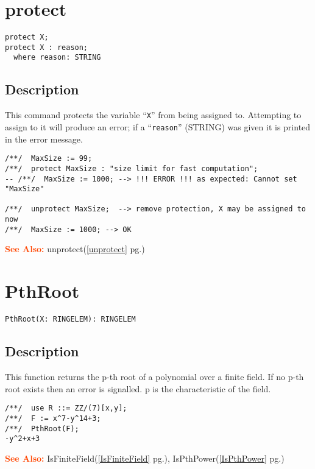\documentclass[a4paper]{mybook}
\newenvironment{command}{}{} %
\newcommand\SeeAlso{\par\textcolor{OrangeRed}{\textbf{\large See Also: }}}
\begin{document}
\section{protect}
\label{protect}
\begin{command} %


\begin{Verbatim}[label=syntax, rulecolor=\color{MidnightBlue},
frame=single]
protect X;
protect X : reason;
  where reason: STRING
\end{Verbatim}


\subsection*{Description}

This command protects the variable ``\verb&X&'' from being assigned to.
Attempting to assign to it will produce an error; if a ``\verb&reason&''
(STRING) was given it is printed in the error message.
\begin{Verbatim}[label=example, rulecolor=\color{PineGreen}, frame=single]
/**/  MaxSize := 99;
/**/  protect MaxSize : "size limit for fast computation";
-- /**/  MaxSize := 1000; --> !!! ERROR !!! as expected: Cannot set "MaxSize"

/**/  unprotect MaxSize;  --> remove protection, X may be assigned to now
/**/  MaxSize := 1000; --> OK
\end{Verbatim}


\SeeAlso %
  unprotect(\ref{unprotect} pg.\pageref{unprotect})
\end{command} %

\section{PthRoot}
\label{PthRoot}
\begin{command} %


\begin{Verbatim}[label=syntax, rulecolor=\color{MidnightBlue},
frame=single]
PthRoot(X: RINGELEM): RINGELEM
\end{Verbatim}


\subsection*{Description}

This function returns the p-th root of a polynomial over a finite
field.  If no p-th root exists then an error is signalled.  p is
the characteristic of the field.
\begin{Verbatim}[label=example, rulecolor=\color{PineGreen}, frame=single]
/**/  use R ::= ZZ/(7)[x,y];
/**/  F := x^7-y^14+3;
/**/  PthRoot(F);
-y^2+x+3
\end{Verbatim}


\SeeAlso %
  IsFiniteField(\ref{IsFiniteField} pg.\pageref{IsFiniteField}), 
    IsPthPower(\ref{IsPthPower} pg.\pageref{IsPthPower})
\end{command} %
\end{document}
